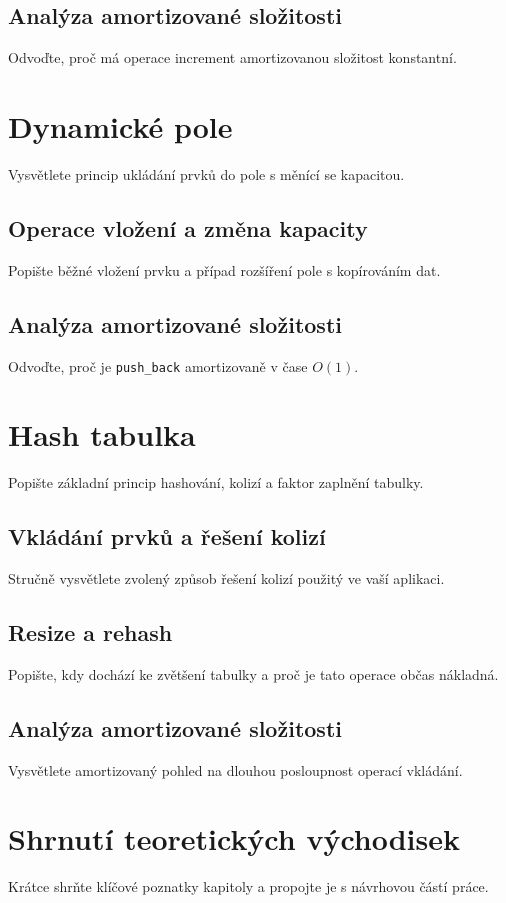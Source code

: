 \subsection{Analýza amortizované složitosti}
Odvoďte, proč má operace increment amortizovanou složitost konstantní.

\section{Dynamické pole}
Vysvětlete princip ukládání prvků do pole s měnící se kapacitou.

\subsection{Operace vložení a změna kapacity}
Popište běžné vložení prvku a případ rozšíření pole s kopírováním dat.

\subsection{Analýza amortizované složitosti}
Odvoďte, proč je \texttt{push\_back} amortizovaně v čase \(O(1)\).

\section{Hash tabulka}
Popište základní princip hashování, kolizí a faktor zaplnění tabulky.

\subsection{Vkládání prvků a řešení kolizí}
Stručně vysvětlete zvolený způsob řešení kolizí použitý ve vaší aplikaci.

\subsection{Resize a rehash}
Popište, kdy dochází ke zvětšení tabulky a proč je tato operace občas nákladná.

\subsection{Analýza amortizované složitosti}
Vysvětlete amortizovaný pohled na dlouhou posloupnost operací vkládání.

\section{Shrnutí teoretických východisek}
Krátce shrňte klíčové poznatky kapitoly a propojte je s návrhovou částí práce.
